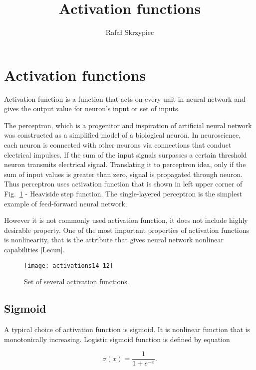 \documentclass[]{article}
\title{Activation functions}
\author{Rafa\l \vspace{1cm} Skrzypiec}
\date{}
\theoremstyle{definition}
\begin{document}
\maketitle

\section{Activation functions}

Activation function is a function that acts on every unit in neural network and gives the output value for neuron's input or set of inputs. 

The perceptron, which is a progenitor and inspiration of artificial neural network was constructed as a simplified model of a biological neuron. In neuroscience, each neuron is connected with other neurons via connections that conduct electrical impulses. If the sum of the input signals surpasses a certain threshold neuron transmits electrical signal. Translating it to perceptron idea, only if the sum of input values is greater than zero, signal is propagated through neuron. Thus perceptron uses activation function that is shown in left upper corner of Fig.~\ref{fig:activations} - Heaviside step function. The single-layered perceptron is the simplest example of feed-forward neural network. 

However it is not commonly used activation function, it does not include highly desirable property. One of the most important properties of activation functions is nonlinearity, that is the attribute that gives neural network nonlinear capabilities [Lecun]. 


\begin{figure}[h!]
	\centering
	\texttt{[image: activations14\_12]}
	\caption{Set of several activation functions.}
	\label{fig:activations}
\end{figure}



\subsection{Sigmoid}

A typical choice of activation function is sigmoid. It is nonlinear function that is monotonically increasing. Logistic sigmoid function is defined by equation

\begin{equation}
\sigma(x) = \frac{1}{1+e^{-x}}.
\end{equation}
\end{document}
